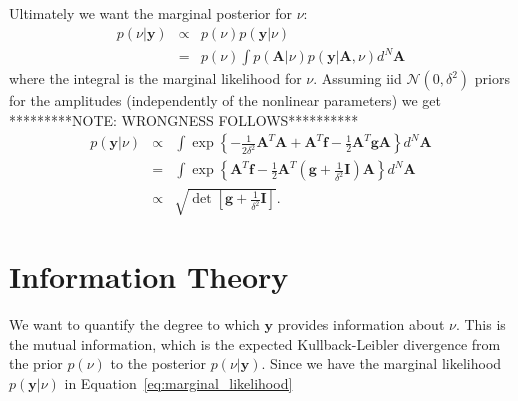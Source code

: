\documentclass[a4paper, 10pt]{article}
\begin{document}
Ultimately we want the marginal posterior for $\nu$:
\begin{eqnarray}
p(\nu | \mathbf{y}) &\propto& p(\nu)p(\mathbf{y} | \nu)\\
&=& p(\nu)\int p(\mathbf{A}|\nu)p(\mathbf{y} | \mathbf{A}, \nu) d^N\mathbf{A}
\end{eqnarray}
where the integral is the marginal likelihood for $\nu$. Assuming
iid $\mathcal{N}(0, \delta^2)$ priors for the amplitudes (independently of
the nonlinear parameters) we get
*********NOTE: WRONGNESS FOLLOWS**********
\begin{eqnarray}
p(\mathbf{y} | \nu)
&\propto& \int\exp\left\{
 -\frac{1}{2\delta^2} \mathbf{A}^T\mathbf{A}
 +\mathbf{A}^T\mathbf{f}
 -\frac{1}{2} \mathbf{A}^T\mathbf{g}\mathbf{A}
\right\} d^N\mathbf{A}\nonumber\\
&=&
\int\exp\left\{
\mathbf{A}^T\mathbf{f}
 -\frac{1}{2} \mathbf{A}^T\left(\mathbf{g} + \frac{1}{\delta^2}\mathbf{I}\right)\mathbf{A}
\right\} d^N\mathbf{A}\nonumber\\
&\propto&
\sqrt{\det\left[\mathbf{g} + \frac{1}{\delta^2}\mathbf{I}\right]}.\label{eq:marginal_likelihood}
\end{eqnarray}

\section{Information Theory}
We want to quantify the degree to which $\mathbf{y}$ provides information about
$\nu$. This is the mutual information, which is the expected Kullback-Leibler
divergence from the prior $p(\nu)$ to the posterior $p(\nu | \mathbf{y})$.
Since we have the marginal likelihood $p(\mathbf{y} | \nu)$ in
Equation~\ref{eq:marginal_likelihood}
\end{document}
